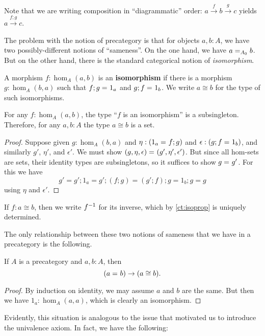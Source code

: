Note that we are writing composition in ``diagrammatic'' order: $a\xrightarrow{f} b \xrightarrow{g}c$ yields $a \xrightarrow{f;g} c$.

The problem with the notion of precategory is that for objects $a,b:A$, we have two possibly-different notions of ``sameness''.  On the one hand, we have $\id[A_0]{a}{b}$.  But on the other hand, there is the standard categorical notion of \emph{isomorphism}.

\begin{defn}\label{ct:isomorphism}
  A morphism $f:\hom_A(a,b)$ is an \textbf{isomorphism} if there is a morphism $g:\hom_A(b,a)$ such that $\id{f;g}{1_a}$ and $\id{g;f}{1_b}$.  We write $a\cong b$ for the type of such isomorphisms.
\end{defn}

\begin{lem}\label{ct:isoprop}
  For any $f:\hom_A(a,b)$, the type ``$f$ is an isomorphism'' is a subsingleton.
  Therefore, for any $a,b:A$ the type $a\cong b$ is a set.
\end{lem}
\begin{proof}
  Suppose given $g:\hom_A(b,a)$ and $\eta:(\id{1_a}{f; g})$ and $\epsilon:(\id{g; f}{1_b})$, and similarly $g'$, $\eta'$, and $\epsilon'$.  We must show $\id{(g,\eta,\epsilon)}{(g',\eta',\epsilon')}$.
  But since all hom-sets are sets, their identity types are subsingletons, so it suffices to show $\id g {g'}$.
  For this we have
  \[g' = g';1_a = g'; (f; g) = (g'; f); g = 1_b; g = g\]
  using $\eta$ and $\epsilon'$.
\end{proof}

If $f:a\cong b$, then we write $\inv f$ for its inverse, which by \autoref{ct:isoprop} is uniquely determined.

The only relationship between these two notions of sameness that we have in a precategory is the following.

\begin{lem}\label{ct:idtoiso}
  If $A$ is a precategory and $a,b:A$, then
  \[(\id a b)\to (a \cong b).\]
\end{lem}
\begin{proof}
  By induction on identity, we may assume $a$ and $b$ are the same.  But then we have $1_a:\hom_A(a,a)$, which is clearly an isomorphism.
\end{proof}

Evidently, this situation is analogous to the issue that motivated us to introduce the univalence axiom.  In fact, we have the following:

